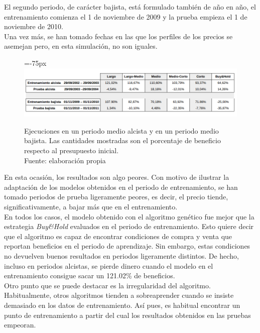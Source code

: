 El segundo periodo, de car\'acter bajista, est\'a formulado tambi\'en de a\~no en a\~no, el entrenamiento comienza el 1 de noviembre de 2009 y la prueba empieza el 1 de noviembre de 2010.\\

Una vez m\'as, se han tomado fechas en las que los perfiles de los precios se asemejan pero, en esta simulaci\'on, no son iguales. \\

     	\begin{figure}[H]
     		\centering\leftskip=-75px
     		\includegraphics[scale=0.60]{imagenes/Medium_period.png}
     		\caption[Ejecuciones en un periodo medio alcista y en un periodo medio bajista]{Ejecuciones en un periodo medio alcista y en un periodo medio bajista. Las cantidades mostradas son el porcentaje de beneficio respecto al presupuesto inicial.\\ Fuente: elaboraci\'on propia}
     		\label{fig:medium_period}
     	\end{figure}
     	
En esta ocasi\'on, los resultados son algo peores. Con motivo de ilustrar la adaptaci\'on de los modelos obtenidos en el periodo de entrenamiento, se han tomado periodos de prueba ligeramente peores, es decir, el precio tiende, significativamente, a bajar m\'as que en el entrenamiento.\\

En todos los casos, el modelo obtenido con el algoritmo gen\'etico fue mejor que la estrategia \textit{Buy\&Hold} evaluados en el periodo de entrenamiento. Esto quiere decir que el algoritmo es capaz de encontrar condiciones de compra y venta que reportan beneficios en el periodo de aprendizaje. Sin embargo, estas condiciones no devuelven buenos resultados en periodos ligeramente distintos. De hecho, incluso en periodos alcistas, se pierde dinero cuando el modelo en el entrenamiento consigue sacar un 121.02\% de beneficios.\\

Otro punto que se puede destacar es la irregularidad del algoritmo. Habitualmente, otros algoritmos tienden a sobreaprender cuando se insiste demasiado en los datos de entrenamiento. As\'i pues, es habitual encontrar un punto de entrenamiento a partir del cual los resultados obtenidos en las pruebas empeoran.\\

